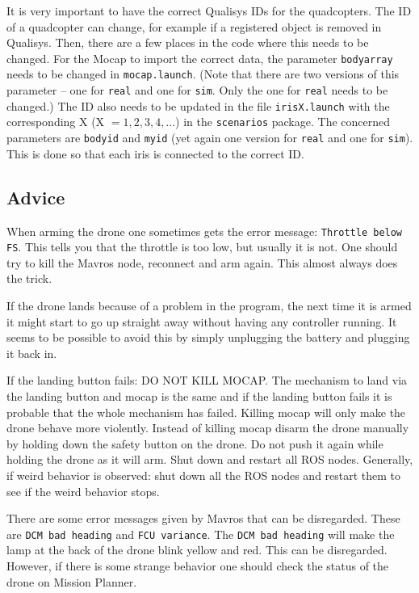 \documentclass[titlepage,11pt,a4paper]{article}
\begin{document}
It is very important to have the correct Qualisys IDs for the
quadcopters. The ID of a quadcopter can change, for example if a
registered object is removed in Qualisys. Then, there are a few places
in the code where this needs to be changed. For the Mocap to import
the correct data, the parameter \texttt{body\textunderscore array}
needs to be changed in \texttt{mocap.launch}. (Note that there are two
versions of this parameter -- one for \texttt{real} and one for
\texttt{sim}. Only the one for \texttt{real} needs to be changed.) The
ID also needs to be updated in the file \texttt{irisX.launch} with the
corresponding X (X $= 1, 2, 3, 4, \dots$) in the \texttt{scenarios}
package. The concerned parameters are \texttt{body\textunderscore id}
and \texttt{my\textunderscore id} (yet again one version for
\texttt{real} and one for \texttt{sim}). This is done so that each
iris is connected to the correct ID.

\subsection{Advice}
When arming the drone one sometimes gets the error message:
\texttt{Throttle below FS}. This tells you that the throttle is too
low, but usually it is not. One should try to kill the Mavros node,
reconnect and arm again. This almost always does the trick.

If the drone lands because of a problem in the program, the next time
it is armed it might start to go up straight away without having any
controller running. It seems to be possible to avoid this by simply
unplugging the battery and plugging it back in.

If the landing button fails: DO NOT KILL MOCAP. The mechanism to land
via the landing button and mocap is the same and if the landing button
fails it is probable that the whole mechanism has failed. Killing
mocap will only make the drone behave more violently. Instead of
killing mocap disarm the drone manually by holding down the safety
button on the drone. Do not push it again while holding the drone as
it will arm. Shut down and restart all ROS nodes. Generally, if weird
behavior is observed: shut down all the ROS nodes and restart them to
see if the weird behavior stops.

There are some error messages given by Mavros that can be
disregarded. These are \texttt{DCM bad heading} and \texttt{FCU
  variance}. The \texttt{DCM bad heading} will make the lamp at the back of the
drone blink yellow and red. This can be disregarded. However, if there
is some strange behavior one should check the status of the drone on
Mission Planner.
\end{document}
